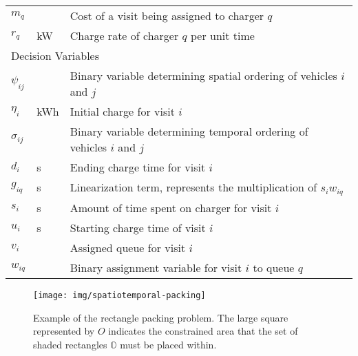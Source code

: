 \documentclass[utf8]{FrontiersinHarvard}
\begin{document}
\begin{table}[!htpb]
\begin{tabularx}{\textwidth}{l l l}
    $m_q$         &       & Cost of a visit being assigned to charger $q$                                                                   \\
    $r_q$         & kW    & Charge rate of charger $q$ per unit time                                                                        \\
    \hline \multicolumn{3}{l}{Decision Variables}                                                                                           \\
    \hline $\psi_{ij}$          &                         & Binary variable determining spatial ordering of vehicles $i$ and $j$               \\
    $\eta_i$     & kWh  & Initial charge for visit $i$                                                                                         \\
    $\sigma_{ij}$  &      & Binary variable determining temporal ordering of vehicles $i$ and $j$                                                \\
    $d_i$     & s    & Ending charge time for visit $i$                                                                                     \\
    $g_{iq}$  & s    & Linearization term, represents the multiplication of $s_i w_{iq}$                                                     \\
    $s_i$     & s    & Amount of time spent on charger for visit $i$                                                                        \\
    $u_i$     & s    & Starting charge time of visit $i$                                                                                    \\
    $v_i$     &      & Assigned queue for visit $i$                                                                                         \\
    $w_{iq}$  &      & Binary assignment variable for visit $i$ to queue $q$                                                                \\
    \bottomrule
  \end{tabularx}
\end{table}

\begin{figure}[htpb]
\centering
    \texttt{[image: img/spatiotemporal-packing]}
    \caption{Example of the rectangle packing problem. The large square represented by $O$ indicates the constrained
      area that the set of shaded rectangles $\mathbb{O}$ must be placed within.}
    \label{fig:packexample}
\end{figure}
\end{document}
